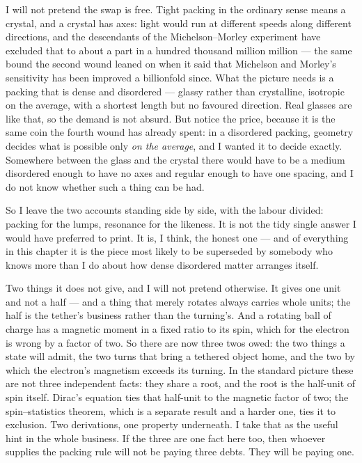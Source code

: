 \documentclass[fontsize=11pt,paper=a4,pagesize=auto,parskip=half-]{scrbook}
\begin{document}
I will not pretend the swap is free. Tight packing in the ordinary sense means a crystal, and a crystal has axes: light would run at different speeds along different directions, and the descendants of the Michelson--Morley experiment have excluded that to about a part in a hundred thousand million million --- the same bound the second wound leaned on when it said that Michelson and Morley's sensitivity has been improved a billionfold since. What the picture needs is a packing that is dense and disordered --- glassy rather than crystalline, isotropic on the average, with a shortest length but no favoured direction. Real glasses are like that, so the demand is not absurd. But notice the price, because it is the same coin the fourth wound has already spent: in a disordered packing, geometry decides what is possible only \emph{on the average}, and I wanted it to decide exactly. Somewhere between the glass and the crystal there would have to be a medium disordered enough to have no axes and regular enough to have one spacing, and I do not know whether such a thing can be had.

So I leave the two accounts standing side by side, with the labour divided: packing for the lumps, resonance for the likeness. It is not the tidy single answer I would have preferred to print. It is, I think, the honest one --- and of everything in this chapter it is the piece most likely to be superseded by somebody who knows more than I do about how dense disordered matter arranges itself.


Two things it does not give, and I will not pretend otherwise. It gives one unit and not a half --- and a thing that merely rotates always carries whole units; the half is the tether's business rather than the turning's. And a rotating ball of charge has a magnetic moment in a fixed ratio to its spin, which for the electron is wrong by a factor of two. So there are now three twos owed: the two things a state will admit, the two turns that bring a tethered object home, and the two by which the electron's magnetism exceeds its turning. In the standard picture these are not three independent facts: they share a root, and the root is the half-unit of spin itself. Dirac's equation ties that half-unit to the magnetic factor of two; the spin--statistics theorem, which is a separate result and a harder one, ties it to exclusion. Two derivations, one property underneath. I take that as the useful hint in the whole business. If the three are one fact here too, then whoever supplies the packing rule will not be paying three debts. They will be paying one.
\end{document}
